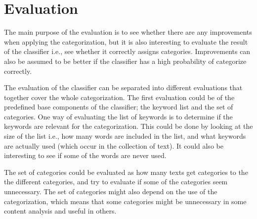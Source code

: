 \section{Evaluation}
The main purpose of the evaluation is to see whether there are any improvements when applying the categorization, but it is also interesting to evaluate the result of the classifier i.e., see whether it correctly assigns categories. Improvements can also be assumed to be better if the classifier has a high probability of categorize correctly.



The evaluation of the classifier can be separated into different evaluations that together cover the whole categorization. 
The first evaluation could be of the predefined base components of the classifier; the keyword list and the set of categories. One way of evaluating the list of keywords is to determine if the keywords are relevant for the categorization. This could be done by looking at the size of the list i.e., how many words are included in the list, and what keywords are actually used (which occur in the collection of text). It could also be interesting to see if some of the words are never used. 

The set of categories could be evaluated as how many texts get categories to the the different categories, and try to evaluate if some of the categories seem unnecessary. The set of categories might also depend on the use of the categorization, which means that some categories might be unnecessary in some content analysis and useful in others. 

